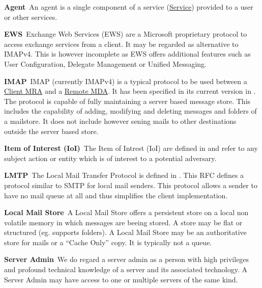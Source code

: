 \documentclass[a4paper,appendixprefix,pdfusetitle,twocolumn,fontsize=8pt,attachdocs,draft,status=draft]{scrbook}
\newenvironment{entry}{\par\leavevmode\hangpara{1.5mm}{1}\ignorespaces}{\RaggedRight\par}
\newcommand*{\mainentry}[2]{{\bfseries{#1\label{def:#1}}}~#2\par}
\newcommand*{\defref}[1]{\hyperref[def:#1]{#1}}
\begin{document}
\begin{entry}
  \mainentry{Agent}{An agent is a single component of a service (\defref{Service}) provided to a user or other services.}
\end{entry}

\begin{entry}
  \mainentry{EWS}{Exchange Web Services (EWS) are a Microsoft proprietary protocol to access exchange services from a client. It may be regarded as alternative to IMAPv4. This is however incomplete as EWS offers additional features such as User Configuration, Delegate Management or Unified Messaging.}
\end{entry}

\begin{entry}
  \mainentry{IMAP}{IMAP (currently IMAPv4) is a typical protocol to be used between a \defref{Client MRA} and a \defref{Remote MDA}. It has been specified in its current version in \cite{RFC3501}. The protocol is capable of fully maintaining a server based message store. This includes the capability of adding, modifying and deleting messages and folders of a mailstore. It does not include however sening mails to other destinations outside the server based store.}
\end{entry}

\begin{entry}
	\mainentry{Item of Interest (IoI)}{The Item of Intrest (IoI) are defined in \cite{anon_terminology} and refer to any subject action or entity which is of interest to a potential adversary.}
\end{entry}

\begin{entry}
  \mainentry{LMTP}{The Local Mail Transfer Protocol is defined in \cite{RFC2033}. This RFC defines a protocol similar to SMTP for local mail senders. This protocol allows a sender to have no mail queue at all and thus simplifies the client implementation.}
\end{entry}

\begin{entry}
  \mainentry{Local Mail Store}{A Local Mail Store offers a persistent store on a local non volatile memory in which messages are beeing stored. A store may be flat or structured (eg. supports folders). A Local Mail Store may be an authoritative store for mails or a ``Cache Only'' copy. It is typically not a queue.}
\end{entry}

\begin{entry}
  \mainentry{Server Admin}{We do regard a server admin as a person with high privileges and profound technical knowledge of a server and its associated technology. A Server Admin may have access to one or multiple servers of the same kind.}
\end{entry}
\end{document}
